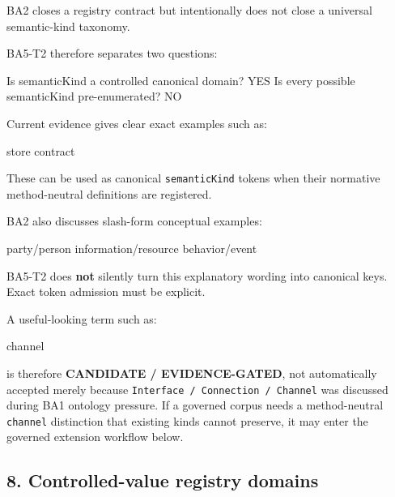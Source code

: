 \documentclass[
  10pt,
  a4paper,
]{article}
\newenvironment{Shaded}{}{}
\newcommand{\NormalTok}[1]{#1}
\begin{document}
BA2 closes a registry contract but intentionally does not close a
universal semantic-kind taxonomy.

BA5-T2 therefore separates two questions:

\begin{Shaded}
\begin{Highlighting}[]
\NormalTok{Is semanticKind a controlled canonical domain?   YES}
\NormalTok{Is every possible semanticKind pre{-}enumerated?   NO}
\end{Highlighting}
\end{Shaded}

Current evidence gives clear exact examples such as:

\begin{Shaded}
\begin{Highlighting}[]
\NormalTok{store}
\NormalTok{contract}
\end{Highlighting}
\end{Shaded}

These can be used as canonical \texttt{semanticKind} tokens when their
normative method-neutral definitions are registered.

BA2 also discusses slash-form conceptual examples:

\begin{Shaded}
\begin{Highlighting}[]
\NormalTok{party/person}
\NormalTok{information/resource}
\NormalTok{behavior/event}
\end{Highlighting}
\end{Shaded}

BA5-T2 does \textbf{not} silently turn this explanatory wording into
canonical keys. Exact token admission must be explicit.

A useful-looking term such as:

\begin{Shaded}
\begin{Highlighting}[]
\NormalTok{channel}
\end{Highlighting}
\end{Shaded}

is therefore \textbf{CANDIDATE / EVIDENCE-GATED}, not automatically
accepted merely because \texttt{Interface\ /\ Connection\ /\ Channel}
was discussed during BA1 ontology pressure. If a governed corpus needs a
method-neutral \texttt{channel} distinction that existing kinds cannot
preserve, it may enter the governed extension workflow below.

\subsection{8. Controlled-value registry
domains}\label{controlled-value-registry-domains}
\end{document}
